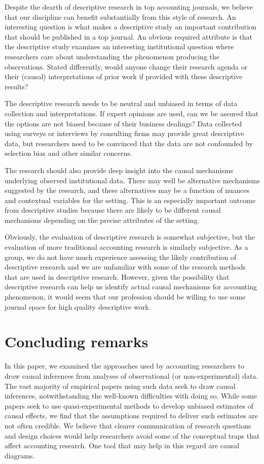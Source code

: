 \documentclass[12pt,reqno,titlepage]{amsart}
\begin{document}
\begin{doublespace}
Despite the dearth of descriptive research in top accounting journals, we believe that our discipline can benefit substantially from this style of research. 
An interesting question is what makes a descriptive study an important contribution that should be published in a top journal.
An obvious required attribute is that the descriptive study examines an interesting institutional question where researchers care about understanding the phenomenon producing the observations.
Stated differently, would anyone change their research agenda or their (causal) interpretations of prior work if provided with these descriptive results?

The descriptive research needs to be neutral and unbiased in terms of data collection and interpretations.
If expert opinions are used, can we be assured that the options are not biased because of their business dealings?
Data collected using surveys or interviews by consulting firms may provide great descriptive data, but researchers need to be convinced that the data are not confounded by selection bias and other similar concerns.

The research should also provide deep insight into the causal mechanisms underlying observed institutional data.
There may well be alternative mechanisms suggested by the research, and these alternatives may be a function of nuances and contextual variables for the setting.
This is an especially important outcome from descriptive studies because there are likely to be different causal mechanisms depending on the precise attributes of the setting.  

Obviously, the evaluation of descriptive research is somewhat subjective, but the evaluation of more traditional accounting research is similarly subjective. 
As a group, we do not have much experience assessing the likely contribution of descriptive research and we are unfamiliar with some of the research methods that are used in descriptive research. 
However, given the possibility that descriptive research can help us identify actual causal mechanisms for accounting phenomenon, it would seem that our profession should be willing to use some journal space for high quality descriptive work.



\section{Concluding remarks} \label{sec:conclude}
In this paper, we examined the approaches used by accounting researchers to draw causal inferences from analyses of observational (or non-experimental) data. 
The vast majority of empirical papers using such data seek to draw causal inferences, notwithstanding the well-known difficulties with doing so.
While some papers seek to use quasi-experimental methods to develop unbiased estimates of causal effects, we find that the assumptions required to deliver such estimates are not often credible. 
We believe that clearer communication of research questions and design choices would help researchers avoid some of the conceptual traps that affect 
accounting research.
One tool that may help in this regard are causal diagrams.


\end{doublespace}
\end{document}

